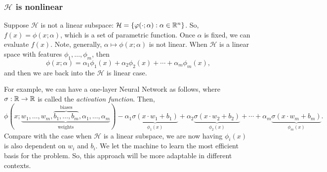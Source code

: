 \subsubsection*{$\mathcal{H}$ is nonlinear}
Suppose $\mathcal{H}$ is not a linear subspace: $\mathcal{H}=\qty{\varphi(\cdot;\alpha):\alpha\in{\mathbb{R}}^n}$. So, $f(x)=\phi(x;\alpha)$, which is a set of parametric function. Once $\alpha$ is fixed, we can evaluate $f(x)$. Note, generally, $\alpha\mapsto\phi(x;\alpha)$ is not linear. When $\mathcal{H}$ is a linear space with features $\phi_1,\dots,\phi_m$, then \[\phi(x;\alpha)=\alpha_1\phi_1(x)+\alpha_2\phi_2(x)+\cdots+\alpha_m\phi_m(x),\] and then we are back into the $\mathcal{H}$ is linear case. \par 
For example, we can have a one-layer Neural Network as follows, where $\sigma:{\mathbb{R}}\to{\mathbb{R}}$ is called the \textit{activation function}. Then, \[\phi(x;\underbrace{w_1,\dots,w_m,\overbrace{b_1,\dots,b_m}^\text{biases},\alpha_1,\dots,\alpha_m}_\text{weights})-\alpha_1\underbrace{\sigma(x\cdot w_1+b_1)}_{\phi_1(x)}+\alpha_2\underbrace{\sigma(x\cdot w_2+b_2)}_{\phi_2(x)}+\cdots+\alpha_m\underbrace{\sigma(x\cdot w_m+b_m)}_{\phi_m(x)}.\] Compare with the case when $\mathcal{H}$ is a linear subspace, we are now having $\phi_i(x)$ is also dependent on $w_i$ and $b_i$. We let the machine to learn the most efficient basis for the problem. So, this approach will be more adaptable in different contexts. 
